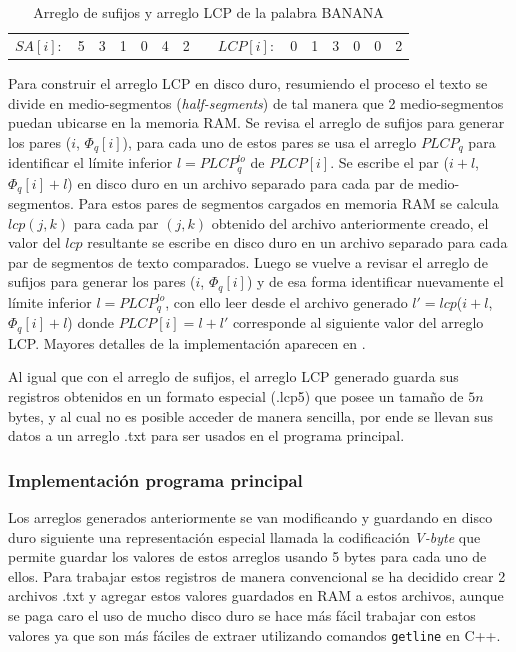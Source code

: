 \begin{table}[!htb]
\centering
\begin{tabular}{c|c|c|c|c|c|c|cc|c|c|c|c|c|c|}
\cline{2-7} \cline{10-15}
$SA[i]:$ & 5 & 3 & 1 & 0 & 4 & 2 &  & $LCP[i]:$ & 0 & 1 & 3 & 0 & 0 & 2 \\ \cline{2-7} \cline{10-15} 
\end{tabular}
\caption{Arreglo de sufijos y arreglo LCP de la palabra BANANA}
\end{table}

Para construir el arreglo LCP en disco duro, resumiendo el proceso el texto se divide en medio-segmentos (\textit{half-segments}) de tal manera que 2 medio-segmentos puedan ubicarse en la memoria RAM. Se revisa el arreglo de sufijos para generar los pares ($i$, $\Phi_{q}[i]$), para cada uno de estos pares se usa el arreglo $PLCP_{q}$ para identificar el límite inferior $l = PLCP_{q}^{lo}$ de $PLCP[i]$. Se escribe el par ($i + l$, $\Phi_{q}[i] + l$) en disco duro en un archivo separado para cada par de medio-segmentos. Para estos pares de segmentos cargados en memoria RAM se calcula $lcp(j,k)$ para cada par $(j,k)$ obtenido del archivo anteriormente creado, el valor del $lcp$ resultante se escribe en disco duro en un archivo separado para cada par de segmentos de texto comparados. Luego se vuelve a revisar el arreglo de sufijos para generar los pares ($i$, $\Phi_{q}[i]$) y de esa forma identificar nuevamente el límite inferior $l = PLCP_{q}^{lo}$, con ello leer desde el archivo generado $l'=lcp$($i + l$, $\Phi_{q}[i] + l$) donde $PLCP[i] = l + l'$ corresponde al siguiente valor del arreglo LCP. Mayores detalles de la implementación aparecen en \cite{emsparse2}.

Al igual que con el arreglo de sufijos, el arreglo LCP generado guarda sus registros obtenidos en un formato especial (.lcp5) que posee un tamaño de $5n$ bytes, y al cual no es posible acceder de manera sencilla, por ende se llevan sus datos a un arreglo .txt para ser usados en el programa principal.

\subsubsection{Implementación programa principal}

Los arreglos generados anteriormente se van modificando y guardando en disco duro siguiente una representación especial llamada la codificación \textit{V-byte} \cite{vbyte} que permite guardar los valores de estos arreglos usando 5 bytes para cada uno de ellos. Para trabajar estos registros de manera convencional se ha decidido crear 2 archivos .txt y agregar estos valores guardados en RAM a estos archivos, aunque se paga caro el uso de mucho disco duro se hace más fácil trabajar con estos valores ya que son más fáciles de extraer utilizando comandos \texttt{getline} en C++.

